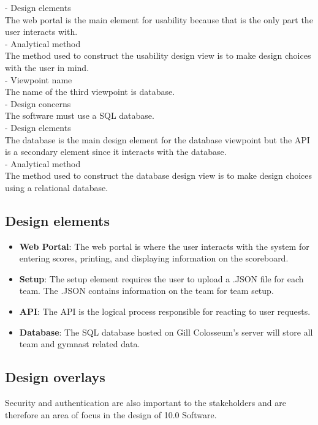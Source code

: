 \documentclass[letterpaper,10pt,draftclsnofoot,onecolumn,]{article}
\begin{document}
- Design elements\\
The web portal is the main element for usability because that is the only part the user interacts with.\\

- Analytical method\\
The method used to construct the usability design view is to make design choices with the user in mind.\\

- Viewpoint name\\
The name of the third viewpoint is database.\\

- Design concerns\\
The software must use a SQL database.\\

- Design elements\\
The database is the main design element for the database viewpoint but the API is a secondary element since it interacts with the database.\\

- Analytical method\\
The method used to construct the database design view is to make design choices using a relational database.

\subsection{Design elements}
\begin{itemize}
    \item \textbf{Web Portal}: The web portal is where the user interacts with the system for entering scores, printing, and displaying information on the scoreboard.
    \item \textbf{Setup}: The setup element requires the user to upload a .JSON file for each team. The .JSON contains information on the team for team setup.
    \item \textbf{API}: The API is the logical process responsible for reacting to user requests.
    \item \textbf{Database}: The SQL database hosted on Gill Colosseum's server will store all team and gymnast related data.
\end{itemize}
\subsection{Design overlays}
Security and authentication are also important to the stakeholders and are therefore an area of focus in the design of 10.0 Software.
\end{document}
